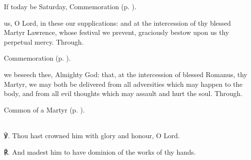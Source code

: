 \begin{rubric}
	If today be Saturday, Commemoration  (p. \pageref{LawrenceVigil}).
\end{rubric}


\label{LawrenceVigil}

{} us, O Lord, in these our supplications: and at the intercession of thy blessed Martyr Lawrence, whose festival we prevent, graciously bestow upon us thy perpetual mercy. Through.

\begin{rubric}
	Commemoration  (p. \pageref{RomanusCollect}).
\end{rubric}



\memorialCollect\label{RomanusCollect}
 we beseech thee, Almighty God: that, at the intercession of blessed Romanus, thy Martyr, we may both be delivered from all adversities which may happen to the body, and from all evil thoughts which may assault and hurt the soul. Through.


\clearpage
{}

\begin{rubric}
	Common of a Martyr (p. \pageref{CommonMartyr}).
\end{rubric}

\firstEvensong
{}\\

℣. Thou hast crowned him with glory and honour, O Lord.

℟. And madest him to have dominion of the works of thy hands.


\mattins
{}\\

